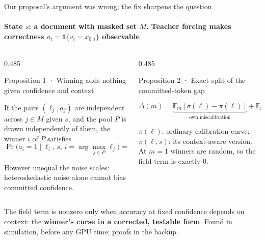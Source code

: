 \documentclass[aspectratio=169,10pt,t]{beamer}
\newcommand{\fnote}[1]{{\color{ink2}\scriptsize #1\par}}
\newcommand{\paneltitle}[1]{{\color{accentdark}\small\firasemibold #1}\par\vspace{0.8mm}}
\begin{document}
\begin{frame}{Our proposal's argument was wrong; the fix sharpens the question}
  \framesubtitle{State $s$: a document with masked set $M$. Teacher forcing makes correctness $a_i = \mathbb{1}\{v_i = x_{0,i}\}$ observable}
  \vspace{1.5mm}
  \begin{columns}[T,onlytextwidth]
    \begin{column}{0.485\textwidth}
      \begin{panel}[height=36mm]
        \paneltitle{Proposition 1 · Winning adds nothing given confidence and context}
        If the pairs $(\ell_j, a_j)$ are independent across $j \in M$ given $s$, and the pool
        $P$ is drawn independently of them, the winner $i$ of $P$ satisfies
        \[
          \Pr\big(a_i = 1 \mid \ell_i,\, s,\, i = \arg\max_{j\in P} \ell_j\big) = \pi(\ell_i, s).
        \]
        \fnote{However unequal the noise scales: heteroskedastic noise alone cannot bias
        committed confidence.}
      \end{panel}
    \end{column}
    \begin{column}{0.485\textwidth}
      \begin{panel}[height=36mm]
        \paneltitle{Proposition 2 · Exact split of the committed-token gap}
        \[
          \Delta(m) =
          \underbrace{\mathbb{E}_m[\sigma(\ell) - \pi(\ell)]}_{\text{own miscalibration}}
          + \underbrace{\mathbb{E}_m[\pi(\ell) - \pi(\ell, s)]}_{\text{field term}}
        \]
        \fnote{$\pi(\ell)$: ordinary calibration curve; $\pi(\ell,s)$: its context-aware
        version. At $m = 1$ winners are random, so the field term is exactly 0.}
      \end{panel}
    \end{column}
  \end{columns}
  \vspace{2.5mm}
  \begin{takeaway}
    The field term is nonzero only when accuracy at fixed confidence depends on context: the
    \textbf{winner's curse in a corrected, testable form}. Found in simulation, before any
    GPU time; proofs in the backup.
  \end{takeaway}
\end{frame}
\end{document}
